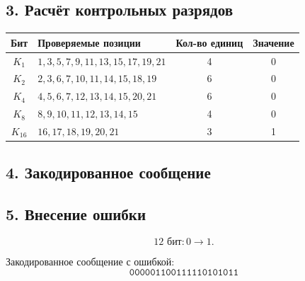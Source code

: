 \documentclass[a4paper,12pt]{article}
\begin{document}
\subsection*{3. Расчёт контрольных разрядов}

\begin{center}
  \begin{tabular}{c|l|c|c}
    \toprule
    Бит & Проверяемые позиции & Кол-во единиц & Значение \\
    \midrule
    $K_1$ & $1,3,5,7,9,11,13,15,17,19,21$ & 4 & 0 \\
    $K_2$ & $2,3,6,7,10,11,14,15,18,19$ & 6 & 0 \\
    $K_4$ & $4,5,6,7,12,13,14,15,20,21$ & 6 & 0 \\
    $K_8$ & $8,9,10,11,12,13,14,15$ & 4 & 0 \\
    $K_{16}$ & $16,17,18,19,20,21$ & 3 & 1 \\
    \bottomrule
  \end{tabular}
\end{center}

\subsection*{4. Закодированное сообщение}

\begin{center}
\end{center}

\subsection*{5. Внесение ошибки}

$$
\text{12 бит} : 0 \rightarrow 1.
$$

\begin{center}
\end{center}

Закодированное сообщение с ошибкой:
$$
\texttt{000001100111110101011}
$$
\end{document}
